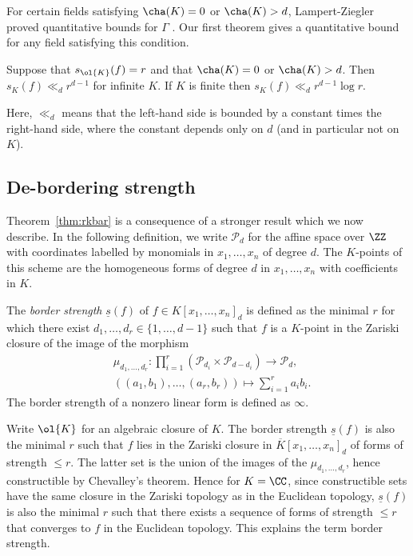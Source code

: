 \documentclass{amsart}
\newcommand{\cP}{\mathcal{P}}
\newcommand{\ul}[1]{\underline{#1}}
\begin{document}
For certain fields satisfying $\cha(K)=0$ or $\cha(K)>d$, Lampert-Ziegler
proved quantitative bounds for $\Gamma$ \cite{Lampert22}.  Our first
theorem gives a quantitative bound for any field satisfying this
condition.

\begin{thm}\label{thm:rkbar}
Suppose that $s_{\ol{K}}(f) = r$ and that $\cha(K)=0$ or $\cha(K)>d$. Then $s_K(f) \ll_d r^{d-1}$ for infinite $K.$ If $K$ is finite then  $s_K(f) \ll_d r^{d-1}\log r$.
\end{thm}

Here, $\ll_d$ means that the left-hand side is bounded by a constant
times the right-hand side, where the constant depends only on $d$
(and in particular not on $K$). 

\subsection{De-bordering strength}

Theorem~\ref{thm:rkbar} is a consequence of a stronger result which we now describe.
In the following definition, we write $\cP_d$ for
the affine space over $\ZZ$ with coordinates labelled by monomials in
$x_1,\ldots,x_n$ of degree $d$. The $K$-points of this scheme are the
homogeneous forms of degree $d$ in $x_1,\ldots,x_n$ with coefficients
in $K$.

\begin{de}
The {\em border strength} $\ul{s}(f)$ of $f \in K[x_1,\ldots,x_n]_d$ is defined as the minimal $r$ for
which there exist $d_1,\ldots,d_r \in \{1,\ldots,d-1\}$ such that $f$
is a $K$-point in the Zariski closure of the image of the morphism
\begin{align*} &\mu_{d_1,\ldots,d_r}: \prod_{i=1}^r (\cP_{d_i} \times
\cP_{d-d_i}) \to \cP_d, \\
&((a_1,b_1),\ldots,(a_r,b_r)) \mapsto \sum_{i=1}^r a_i b_i. 
\end{align*}
The border strength of a nonzero linear form is defined as $\infty$.
\end{de}

Write $\ol{K}$ for an algebraic closure of $K$. 
The border strength $\ul{s}(f)$ is also the minimal $r$ such that $f$
lies in the Zariski closure in $\overline{K}[x_1,\ldots,x_n]_d$ of forms
of strength $\leq r$. The latter set is the union of the images of the
$\mu_{d_1,\ldots,d_r}$, hence constructible by Chevalley's theorem. Hence
for $K=\CC$, since constructible sets have the same closure in the Zariski
topology as in the Euclidean topology, $\ul{s}(f)$ is also the minimal
$r$ such that there exists a sequence of forms of strength $\leq r$
that converges to $f$ in the Euclidean topology. This explains the
term border strength. 
\end{document}
